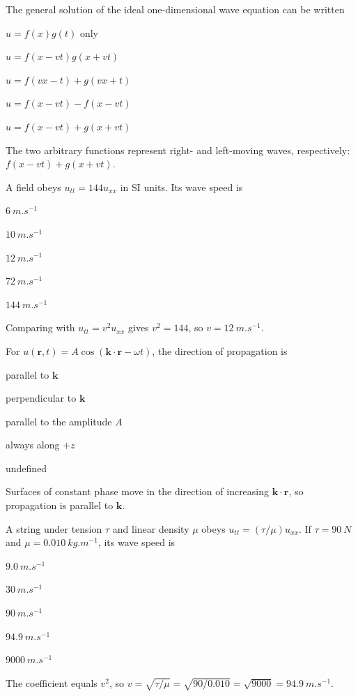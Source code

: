 \documentclass[10pt,a4paper,full]{physicsquiz}
\newcommand{\bankq}[9]{%
  \begin{quizquestion}[
    id=#1,
    topic={#2},
    difficulty=#3,
    marks=1,
    correct=#4,
    tags={#5},
    outcome={#6}
  ]
    #7
    \begin{choiceoptions}
      #8
    \end{choiceoptions}
  \end{quizquestion}
  \begin{quizsolution}
    #9
  \end{quizsolution}
}
\begin{document}
\begin{quizbank}
\bankq{waveeq-075}{Wave Equations in 1D, 2D, and 3D}{applied}{E}{wave-equation,general-solution}{Recognize the d'Alembert solution.}{%
The general solution of the ideal one-dimensional wave equation can be written}{%
\item \(u=f(x)g(t)\) only
\item \(u=f(x-vt)g(x+vt)\)
\item \(u=f(vx-t)+g(vx+t)\)
\item \(u=f(x-vt)-f(x-vt)\)
\item \(u=f(x-vt)+g(x+vt)\)}{%
The two arbitrary functions represent right- and left-moving waves, respectively: \(f(x-vt)+g(x+vt)\).}

\bankq{waveeq-076}{Wave Equations in 1D, 2D, and 3D}{applied}{C}{wave-equation,speed}{Read wave speed from a PDE.}{%
A field obeys \(u_{tt}=144u_{xx}\) in SI units. Its wave speed is}{%
\item \(\SI{6}{m.s^{-1}}\)
\item \(\SI{10}{m.s^{-1}}\)
\item \(\SI{12}{m.s^{-1}}\)
\item \(\SI{72}{m.s^{-1}}\)
\item \(\SI{144}{m.s^{-1}}\)}{%
Comparing with \(u_{tt}=v^2u_{xx}\) gives \(v^2=144\), so \(v=\SI{12}{m.s^{-1}}\).}

\bankq{waveeq-077}{Wave Equations in 1D, 2D, and 3D}{applied}{A}{wave-equation,three-dimensional}{Interpret a three-dimensional plane wave.}{%
For \(u(\mathbf r,t)=A\cos(\mathbf k\cdot\mathbf r-\omega t)\), the direction of propagation is}{%
\item parallel to \(\mathbf k\)
\item perpendicular to \(\mathbf k\)
\item parallel to the amplitude \(A\)
\item always along \(+z\)
\item undefined}{%
Surfaces of constant phase move in the direction of increasing \(\mathbf k\cdot\mathbf r\), so propagation is parallel to \(\mathbf k\).}

\bankq{waveeq-078}{Wave Equations in 1D, 2D, and 3D}{challenge}{D}{wave-equation,string,derivation}{Connect string properties to the wave equation.}{%
A string under tension \(\tau\) and linear density \(\mu\) obeys \(u_{tt}=(\tau/\mu)u_{xx}\). If \(\tau=\SI{90}{N}\) and \(\mu=\SI{0.010}{kg.m^{-1}}\), its wave speed is}{%
\item \(\SI{9.0}{m.s^{-1}}\)
\item \(\SI{30}{m.s^{-1}}\)
\item \(\SI{90}{m.s^{-1}}\)
\item \(\SI{94.9}{m.s^{-1}}\)
\item \(\SI{9000}{m.s^{-1}}\)}{%
The coefficient equals \(v^2\), so \(v=\sqrt{\tau/\mu}=\sqrt{90/0.010}=\sqrt{9000}=\SI{94.9}{m.s^{-1}}\).}


\end{quizbank}
\end{document}
